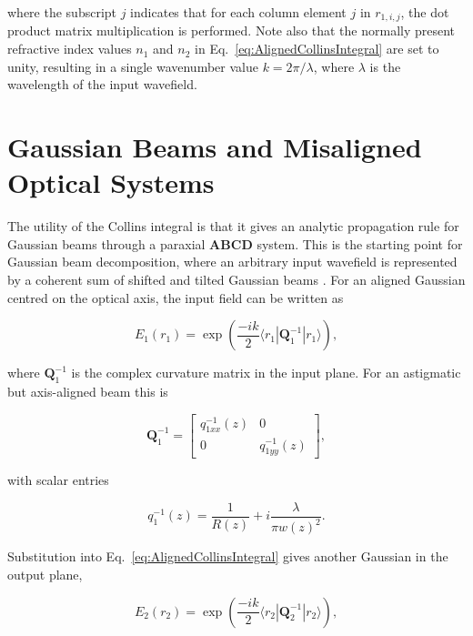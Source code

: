 \documentclass{article}
\begin{document}
where the subscript $j$ indicates that for each column element $j$ in $r_{1,i,j}$, 
the dot product matrix multiplication is performed. 
Note also that the normally present refractive index values $n_1$ and $n_2$ in Eq.~\eqref{eq:AlignedCollinsIntegral} are set to unity, 
resulting in a single wavenumber value $k = 2\pi/\lambda$, where $\lambda$ is the wavelength of the input wavefield.

\section{Gaussian Beams and Misaligned Optical Systems}

The utility of the Collins integral is that it gives an analytic propagation rule for Gaussian beams through a paraxial $\mathbf{ABCD}$ system. 
This is the starting point for Gaussian beam decomposition, where an arbitrary input wavefield is represented by a coherent sum of shifted and tilted Gaussian beams \cite{ashcraft_hybrid_2023, deschamps_gaussian_1971}. 
For an aligned Gaussian centred on the optical axis, the input field can be written as

\begin{equation}
E_1\left(r_1\right) = \exp\left(\frac{-ik}{2} \langle r_1 | \mathbf{Q}_{1}^{-1} | r_1 \rangle\right),
\label{eq:InputGaussianBeam}
\end{equation}

where $\mathbf{Q}_{1}^{-1}$ is the complex curvature matrix in the input plane. 
For an astigmatic but axis-aligned beam this is

\begin{equation}
\mathbf{Q}_1^{-1} = \begin{bmatrix}
q_{1xx}^{-1}(z) & 0 \\
0 & q_{1yy}^{-1}(z)
\end{bmatrix},
\label{eq:Q1_inv}
\end{equation}

with scalar entries

\begin{equation}
q_{1}^{-1}(z) = \frac{1}{R(z)} + i \frac{\lambda}{\pi w(z)^{2}} .
\label{eq:q1_inverse}
\end{equation}

Substitution into Eq.~\eqref{eq:AlignedCollinsIntegral} gives another Gaussian in the output plane,

\begin{equation}
E_2\left(r_2\right) = \exp\left(\frac{-ik}{2} \langle r_2 | \mathbf{Q}_{2}^{-1} | r_2 \rangle\right),
\label{eq:OutputGaussianBeam}
\end{equation}
\end{document}
